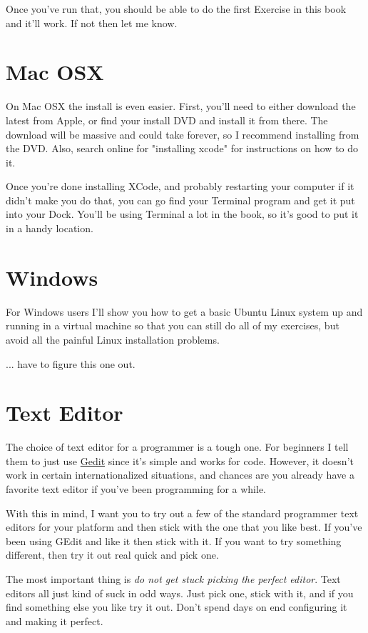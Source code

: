Once you've run that, you should be able to do the first Exercise in
this book and it'll work.  If not then let me know.


\section{Mac OSX}

On Mac OSX the install is even easier.  First, you'll need to either 
download the latest  from Apple, or find your install
DVD and install it from there.  The download will be massive and could
take forever, so I recommend installing from the DVD.  Also, search
online for "installing xcode" for instructions on how to do it.

Once you're done installing XCode, and probably restarting your computer
if it didn't make you do that, you can go find your Terminal program
and get it put into your Dock.  You'll be using Terminal a lot in
the book, so it's good to put it in a handy location.


\section{Windows}

For Windows users I'll show you how to get a basic Ubuntu Linux system up and
running in a virtual machine so that you can still do all of my exercises, but
avoid all the painful Linux installation problems.

... have to figure this one out.


\section{Text Editor}

The choice of text editor for a programmer is a tough one.  For beginners
I tell them to just use \href{http://projects.gnome.org/gedit/}{Gedit} since
it's simple and works for code.  However, it doesn't work in certain
internationalized situations, and chances are you already have a favorite
text editor if you've been programming for a while.

With this in mind, I want you to try out a few of the standard programmer
text editors for your platform and then stick with the one that you like
best.  If you've been using GEdit and like it then stick with it.  If you
want to try something different, then try it out real quick and pick one.

The most important thing is \emph{do not get stuck picking the perfect editor}.
Text editors all just kind of suck in odd ways.  Just pick one, stick with it,
and if you find something else you like try it out.  Don't spend days
on end configuring it and making it perfect.


